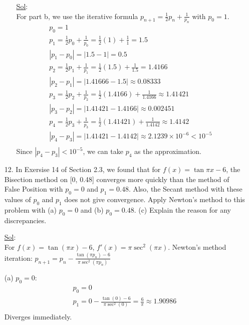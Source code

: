 \begin{enumerate}
\begin{enumerate}
        \underline{Sol}:\\
        For part b, we use the iterative formula \( p_{n+1} =
        \frac{1}{2} p_n + \frac{1}{p_n} \) with \( p_0 = 1 \).
        \[
          \begin{array}{l}
            p_0 = 1 \\
            p_1 = \frac{1}{2} p_0 + \frac{1}{p_0} = \frac{1}{2} (1) +
            \frac{1}{1} = 1.5 \\
            |p_1 - p_0| = |1.5 - 1| = 0.5 \\
            p_2 = \frac{1}{2} p_1 + \frac{1}{p_1} = \frac{1}{2} (1.5)
            + \frac{1}{1.5} = 1.4166 \\
            |p_2 - p_1| = |1.41666 - 1.5| \approx 0.08333 \\
            p_3 = \frac{1}{2} p_2 + \frac{1}{p_2} = \frac{1}{2}
            (1.4166) + \frac{1}{1.4166} \approx 1.41421 \\
            |p_3 - p_2| = |1.41421 - 1.4166| \approx 0.002451 \\
            p_4 = \frac{1}{2} p_3 + \frac{1}{p_3} = \frac{1}{2}
            (1.41421) + \frac{1}{1.4142} \approx 1.4142 \\
            |p_4 - p_3| = |1.41421 - 1.4142| \approx 2.1239 \times
            10^{-6} < 10^{-5} \\
          \end{array}
        \]
        Since \( |p_4 - p_3| < 10^{-5} \), we can take \( p_4 \) as
        the approximation.

    \end{enumerate}

  \item[12.] In Exersise 14 of Section 2.3, we found that for \( f(x)
    = \tan \pi x - 6 \), the Bisection method on [0, 0.48] converges
    more quickly than the method of False Position with \( p_0 = 0 \)
    and \( p_1 = 0.48 \). Also, the Secant method with these values
    of \( p_0 \) and \( p_1 \) does not give convergence. Apply
    Newton's method to this problem with (a) \( p_0 = 0 \) and (b) \(
    p_0 = 0.48 \). (c) Explain the reason for any discrepancies.

    \underline{Sol}:\\
    For \( f(x) = \tan(\pi x) - 6 \), \( f'(x) = \pi \sec^2(\pi x) \).
    Newton's method iteration: \( p_{n+1} = p_n - \frac{\tan(\pi p_n)
    - 6}{\pi \sec^2(\pi p_n)} \)

    (a) \( p_0 = 0 \):
    \[
      \begin{array}{l}
        p_0 = 0 \\
        p_1 = 0 - \frac{\tan(0) - 6}{\pi \sec^2(0)} = \frac{6}{\pi}
        \approx 1.90986 \\
      \end{array}
    \]
    Diverges immediately.


\end{enumerate}
